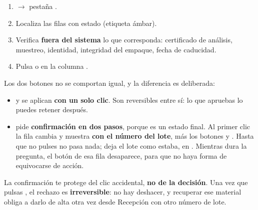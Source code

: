 
\begin{enumerate}
    \item {} $\rightarrow$ pestaña .
    \item Localiza las filas con estado \cuarentena{} (etiqueta ámbar).
    \item Verifica \textbf{fuera del sistema} lo que corresponda: certificado de
          análisis, muestreo, identidad, integridad del empaque, fecha de caducidad.
    \item Pulsa  o  en la columna .
\end{enumerate}



Los dos botones no se comportan igual, y la diferencia es deliberada:

\begin{itemize}
    \item {} y  se aplican \textbf{con un solo clic}.
          Son reversibles entre sí: lo que apruebas lo puedes retener después.
    \item {} pide \textbf{confirmación en dos pasos}, porque
          \rechazado{} es un estado final. Al primer clic la fila cambia y muestra
           \textbf{con el número del lote}, más los botones
           y . Hasta que no pulses
           no pasa nada;  deja el lote como estaba,
          en \cuarentena. Mientras dura la pregunta, el botón  de esa
          fila desaparece, para que no haya forma de equivocarse de acción.
\end{itemize}


\begin{cajaOjo}
La confirmación te protege del clic accidental, \textbf{no de la decisión}.
Una vez que pulsas , el rechazo es \textbf{irreversible}: no hay
deshacer, y recuperar ese material obliga a darlo de alta otra vez desde Recepción
con otro número de lote.
\end{cajaOjo}

